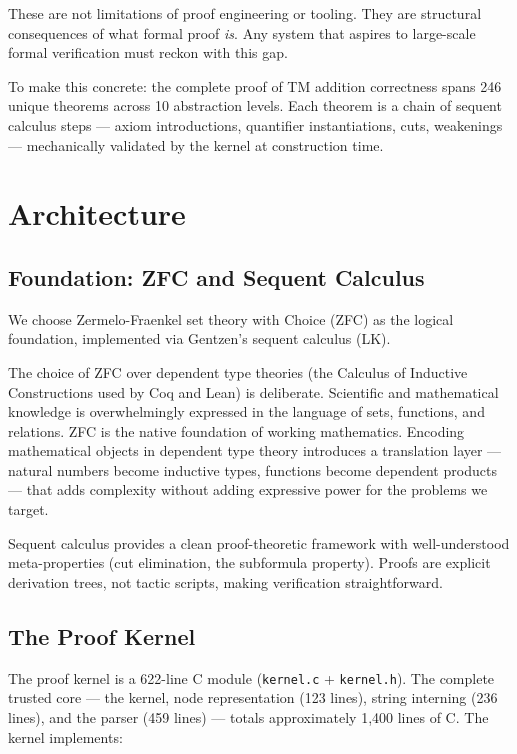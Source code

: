\documentclass[letterpaper]{article}
\begin{document}
These are not limitations of proof engineering or tooling. They are structural
consequences of what formal proof \emph{is}. Any system that aspires to
large-scale formal verification must reckon with this gap.

To make this concrete: the complete proof of TM addition correctness spans
246 unique theorems across 10 abstraction levels. Each theorem is a
chain of sequent calculus steps --- axiom introductions,
quantifier instantiations, cuts, weakenings --- mechanically validated by
the kernel at construction time.

\section{Architecture}
\label{sec:arch}

\subsection{Foundation: ZFC and Sequent Calculus}

We choose Zermelo-Fraenkel set theory with Choice (ZFC) as the logical
foundation, implemented via Gentzen's sequent calculus (LK).

The choice of ZFC over dependent type theories (the Calculus of Inductive
Constructions used by Coq and Lean) is deliberate. Scientific and
mathematical knowledge is overwhelmingly expressed in the language of sets,
functions, and relations. ZFC is the native foundation of working mathematics.
Encoding mathematical objects in dependent type theory introduces a
translation layer --- natural numbers become inductive types, functions become
dependent products --- that adds complexity without adding expressive power
for the problems we target.

Sequent calculus provides a clean proof-theoretic framework with well-understood
meta-properties (cut elimination, the subformula property). Proofs are
explicit derivation trees, not tactic scripts, making verification
straightforward.

\subsection{The Proof Kernel}

The proof kernel is a 622-line C module (\texttt{kernel.c} + \texttt{kernel.h}).
The complete trusted core --- the kernel, node representation (123 lines),
string interning (236 lines), and the parser (459 lines) ---
totals approximately 1,400 lines of C. The kernel implements:
\end{document}
